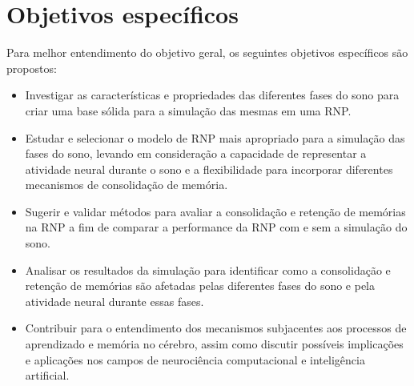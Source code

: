 \section{Objetivos específicos}

Para melhor entendimento do objetivo geral, os seguintes objetivos específicos são propostos:

\begin{itemize}

  \item Investigar as características e propriedades das diferentes fases do sono para criar uma base sólida para a simulação das
mesmas em uma RNP.\@

  \item Estudar e selecionar o modelo de RNP mais apropriado para a simulação das fases do sono, levando em consideração a
capacidade de representar a atividade neural durante o sono e a flexibilidade para incorporar diferentes mecanismos de
consolidação de memória.

  \item Sugerir e validar métodos para avaliar a consolidação e retenção de memórias na RNP a fim de comparar a performance da
  RNP com e sem a simulação do sono.

  \item  Analisar os resultados da simulação para identificar como a consolidação e retenção de memórias são afetadas pelas
diferentes fases do sono e pela atividade neural durante essas fases.

  \item Contribuir para o entendimento dos mecanismos subjacentes aos processos de aprendizado e memória no cérebro, assim como
discutir possíveis implicações e aplicações nos campos de neurociência computacional e inteligência artificial.

\end{itemize}


